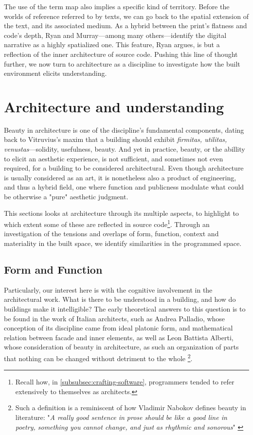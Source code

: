 The use of the term map also implies a specific kind of territory. Before the worlds of reference referred to by texts, we can go back to the spatial extension of the text, and its associated medium. As a hybrid between the print's flatness and code's depth, Ryan and Murray—among many others—identify the digital narrative as a highly spatialized one. This feature, Ryan argues, is but a reflection of the inner architecture of source code. Pushing this line of thought further, we now turn to architecture as a discipline to investigate how the built environment elicits understanding.

\section{Architecture and understanding}
\label{sec:arch-understanding}

Beauty in architecture is one of the discipline's fundamental components, dating back to Vitruvius's maxim that a building should exhibit \emph{firmitas, utilitas, venustas}—solidity, usefulness, beauty. And yet in practice, beauty, or the abillity to elicit an aesthetic experience, is not sufficient, and sometimes not even required, for a building to be considered architectural. Even though architecture is usually considered as an art, it is nonetheless also a product of engineering, and thus a hybrid field, one where function and publicness modulate what could be otherwise a "pure" aesthetic judgment.

This sections looks at architecture through its multiple aspects, to highlight to which extent some of these are reflected in source code\footnote{Recall how, in \ref{subsubsec:crafting-software}, programmers tended to refer extensively to themselves as architects.}. Through an investigation of the tensions and overlaps of form, function, context and materiality in the built space, we identify similarities in the programmed space.

\subsection{Form and Function}
\label{subsec:form-function}

Particularly, our interest here is with the cognitive involvement in the architectural work. What is there to be understood in a building, and how do buildings make it intelligible? The early theoretical answers to this question is to be found in the work of Italian architects, such as Andrea Palladio, whose conception of its discipline came from ideal platonic form, and mathematical relation between facade and inner elements, as well as Leon Battista Alberti, whose consideration of beauty in architecture, as such an organization of parts that nothing can be changed without detriment to the whole \citep{scruton_aesthetics_2013}\footnote{Such a definition is a reminiscent of how Vladimir Nabokov defines beauty in literature: "\emph{A really good sentence in prose should be like a good line in poetry, something you cannot change, and just as rhythmic and sonorous}" \citep{nabokov_lectures_2017}}.

